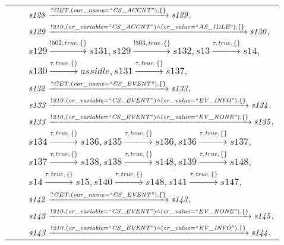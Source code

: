 \begin{tabular}{lcl}
& & $\mathit{s128}\xrightarrow{\mathit{?GET}, \mathit{(var\_name = ``CS\_ACCNT")}, \{\}}\mathit{s129},$ \\
& & $\mathit{s129}\xrightarrow{\mathit{!210}, \mathit{(cr\_variable = ``CS\_ACCNT") \land (cr\_value = ``AS\_IDLE")}, \{\}}\mathit{s130},$ \\
& & $\mathit{s129}\xrightarrow{\mathit{!502}, \mathit{true}, \{\}}\mathit{s131},\mathit{s129}\xrightarrow{\mathit{!503}, \mathit{true}, \{\}}\mathit{s132},\mathit{s13}\xrightarrow{\mathit{\tau}, \mathit{true}, \{\}}\mathit{s14},$ \\
& & $\mathit{s130}\xrightarrow{\mathit{\tau}, \mathit{true}, \{\}}\mathit{assidle},\mathit{s131}\xrightarrow{\mathit{\tau}, \mathit{true}, \{\}}\mathit{s137},$ \\
& & $\mathit{s132}\xrightarrow{\mathit{?GET}, \mathit{(var\_name = ``CS\_EVENT")}, \{\}}\mathit{s133},$ \\
& & $\mathit{s133}\xrightarrow{\mathit{!210}, \mathit{(cr\_variable = ``CS\_EVENT") \land (cr\_value = ``EV\_INFO")}, \{\}}\mathit{s134},$ \\
& & $\mathit{s133}\xrightarrow{\mathit{!210}, \mathit{(cr\_variable = ``CS\_EVENT") \land (cr\_value = ``EV\_NONE")}, \{\}}\mathit{s135},$ \\
& & $\mathit{s134}\xrightarrow{\mathit{\tau}, \mathit{true}, \{\}}\mathit{s136},\mathit{s135}\xrightarrow{\mathit{\tau}, \mathit{true}, \{\}}\mathit{s136},\mathit{s136}\xrightarrow{\mathit{\tau}, \mathit{true}, \{\}}\mathit{s137},$ \\
& & $\mathit{s137}\xrightarrow{\mathit{\tau}, \mathit{true}, \{\}}\mathit{s138},\mathit{s138}\xrightarrow{\mathit{\tau}, \mathit{true}, \{\}}\mathit{s148},\mathit{s139}\xrightarrow{\mathit{\tau}, \mathit{true}, \{\}}\mathit{s148},$ \\
& & $\mathit{s14}\xrightarrow{\mathit{\tau}, \mathit{true}, \{\}}\mathit{s15},\mathit{s140}\xrightarrow{\mathit{\tau}, \mathit{true}, \{\}}\mathit{s148},\mathit{s141}\xrightarrow{\mathit{\tau}, \mathit{true}, \{\}}\mathit{s147},$ \\
& & $\mathit{s142}\xrightarrow{\mathit{?GET}, \mathit{(var\_name = ``CS\_EVENT")}, \{\}}\mathit{s143},$ \\
& & $\mathit{s143}\xrightarrow{\mathit{!210}, \mathit{(cr\_variable = ``CS\_EVENT") \land (cr\_value = ``EV\_NONE")}, \{\}}\mathit{s145},$ \\
& & $\mathit{s143}\xrightarrow{\mathit{!210}, \mathit{(cr\_variable = ``CS\_EVENT") \land (cr\_value = ``EV\_INFO")}, \{\}}\mathit{s144},$ \\

\end{tabular}
